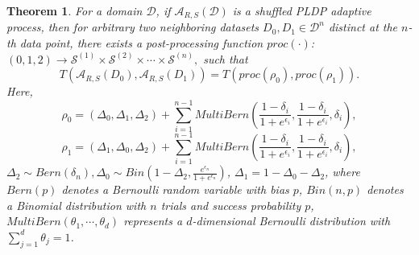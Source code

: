 \documentclass[letterpaper]{article} %
\newtheorem{theorem}{Theorem}
\begin{document}
%
%

\begin{theorem}\label{thm:post3}
For a domain $\mathcal{D}$, if $\mathcal{A}_{R,S}(\mathcal{D})$ is a shuffled PLDP adaptive process, then for arbitrary two neighboring datasets $D_0,D_1 \in \mathcal{D}^n$ distinct at the $n$-th data point, there exists a post-processing function $proc(\cdot)$: $(0,1,2) \rightarrow \mathcal{S}^{(1)} \times \mathcal{S}^{(2)} \times \cdots \times \mathcal{S}^{(n)},$
such that $$T(\mathcal{A}_{R,S}(D_0),\mathcal{A}_{R,S}(D_1)) = T(proc(\rho_0),proc(\rho_1)).$$
Here,
\begin{equation}\label{rho0}
\rho_0 = (\Delta_0,\Delta_1,\Delta_2) + \sum_{i=1}^{n-1}MultiBern\left(\frac{1-\delta_{i}}{1+e^{\epsilon_i}}, \frac{1-\delta_i}{1+e^{\epsilon_i}}, \delta_i\right),
\end{equation}
\begin{equation}\label{rho1}
\rho_1 = (\Delta_1,\Delta_0,\Delta_2) + \sum_{i=1}^{n-1}MultiBern\left(\frac{1-\delta_{i}}{1+e^{\epsilon_i}}, \frac{1-\delta_i}{1+e^{\epsilon_i}}, \delta_i\right),
\end{equation}
$\Delta_2 \sim Bern(\delta_n), \Delta_0 \sim Bin(1-\Delta_2,\frac{e^{\epsilon_{n}}}{1+e^{\epsilon_{n}}})$,
$\Delta_1 = 1 - \Delta_0 - \Delta_2$, where
$Bern(p)$ denotes a Bernoulli random variable with bias $p$, $Bin(n,p)$ denotes a Binomial distribution with $n$ trials and success probability $p$,
 $MultiBern(\theta_1,\cdots, \theta_d)$ represents a $d$-dimensional Bernoulli distribution with $ \sum_{j=1}^d\theta_j = 1$.
\end{theorem}
\end{document}

